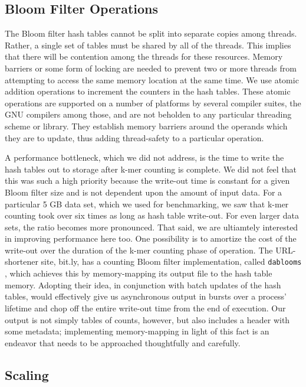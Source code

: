 \documentclass{article}
\begin{document}
\subsection{Bloom Filter Operations}


The Bloom filter hash tables cannot be split into separate copies among threads. Rather, a single set of tables must be shared by all of the threads. This implies that there will be contention among the threads for these resources. Memory barriers or some form of locking are needed to prevent two or more threads from attempting to access the same memory location at the same time. We use atomic addition operations to increment the counters in the hash tables. These atomic operations are supported on a number of platforms by several compiler suites, the GNU compilers among those, and are not beholden to any particular threading scheme or library. They establish memory barriers around the operands which they are to update, thus adding thread-safety to a particular operation.

A performance bottleneck, which we did not address, is the time to write the hash tables out to storage after k-mer counting is complete. We did not feel that this was such a high priority because the write-out time is constant for a given Bloom filter size and is not dependent upon the amount of input data. For a particular 5 GB data set, which we used for benchmarking, we saw that k-mer counting took over six times as long as hash table write-out. For even larger data sets, the ratio becomes more pronounced. That said, we are ultiamtely interested in improving performance here too. One possibility is to amortize the cost of the write-out over the duration of the k-mer counting phase of operation. The URL-shortener site, bit.ly, has a counting Bloom filter implementation, called \texttt{dablooms} \citep{web:dablooms}, which achieves this by memory-mapping its output file to the hash table memory. Adopting their idea, in conjunction with batch updates of the hash tables, would effectively give us asynchronous output in bursts over a process' lifetime and chop off the entire write-out time from the end of execution. Our output is not simply tables of counts, however, but also includes a header with some metadata; implementing memory-mapping in light of this fact is an endeavor that needs to be approached thoughtfully and carefully.

\subsection{Scaling}
\end{document}
